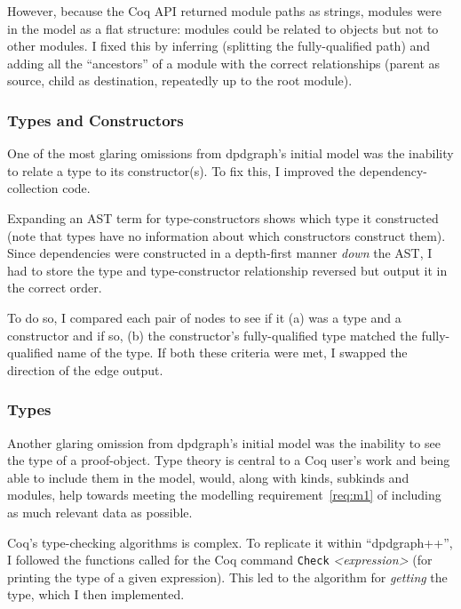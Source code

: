 However, because the Coq API returned module paths as strings, modules were in
the model as a flat structure: modules could be related to objects but not to
other modules. I fixed this by inferring (splitting the fully-qualified path)
and adding all the ``ancestors'' of a module with the correct relationships
(parent as source, child as destination, repeatedly up to the root module).

\subsubsection{Types and Constructors}\label{subsubsec:typecon}

One of the most glaring omissions from dpdgraph's initial model was the
inability to relate a type to its constructor(s). To fix this,
I improved the dependency-collection code.

Expanding an AST term for type-constructors shows which type it constructed
(note that types have no information about which constructors construct them).
Since dependencies were constructed in a depth-first manner \emph{down} the AST,
I had to store the type and type-constructor relationship reversed but output it
in the correct order.

To do so, I compared each pair of nodes to see if it (a) was a type and a
constructor and if so, (b) the constructor's fully-qualified type matched the
fully-qualified name of the type. If both these criteria were met, I swapped the
direction of the edge output.

\subsubsection{Types}


Another glaring omission from dpdgraph's initial model was the inability to see
the type of a proof-object. Type theory is central to a Coq user's work and
being able to include them in the model, would, along with kinds, subkinds and
modules, help towards meeting the modelling requirement~\ref{req:m1} of
including as much relevant data as possible. 

Coq's type-checking algorithms is complex. To replicate it within
``dpdgraph++'', I followed the functions called for the Coq command
\texttt{Check} \emph{<expression>} (for printing the type of a given
expression).  This led to the algorithm for \emph{getting} the type, which I
then implemented.

